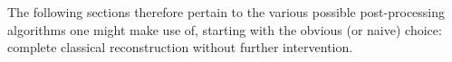The following sections therefore pertain to the various possible
post-processing algorithms one might make use of, starting with the obvious (or
naive) choice: complete classical reconstruction without further intervention.
%
%
%
%
%
%

